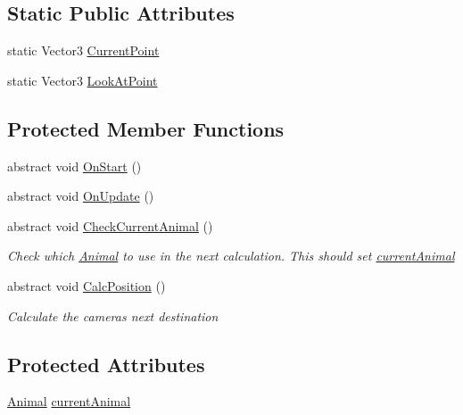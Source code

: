 \subsection*{Static Public Attributes}
\begin{DoxyCompactItemize}
\item 
static Vector3 \mbox{\hyperlink{class_camera_mover_af5e137b14fa9ab77c866f8eb5c961373}{Current\+Point}}
\item 
static Vector3 \mbox{\hyperlink{class_camera_mover_a52c7a78c67f185461d25120f42395db3}{Look\+At\+Point}}
\end{DoxyCompactItemize}
\subsection*{Protected Member Functions}
\begin{DoxyCompactItemize}
\item 
abstract void \mbox{\hyperlink{class_camera_mover_ab96169179c915b4c8599c956dc572fc7}{On\+Start}} ()
\item 
abstract void \mbox{\hyperlink{class_camera_mover_add4a882d9c8684a75d9d2cdacf90a74f}{On\+Update}} ()
\item 
abstract void \mbox{\hyperlink{class_camera_mover_ae1a5b4f8f531adf79cdea73c27ca8203}{Check\+Current\+Animal}} ()
\begin{DoxyCompactList}\small\item\em Check which \mbox{\hyperlink{class_animal}{Animal}} to use in the next calculation. This should set \mbox{\hyperlink{class_camera_mover_a8b863da058e5a1984fd686e09ee2689f}{current\+Animal}} \end{DoxyCompactList}\item 
abstract void \mbox{\hyperlink{class_camera_mover_afe44c2188d44a3fdb72acdf0d12563a9}{Calc\+Position}} ()
\begin{DoxyCompactList}\small\item\em Calculate the camera\textquotesingle{}s next destination \end{DoxyCompactList}\end{DoxyCompactItemize}
\subsection*{Protected Attributes}
\begin{DoxyCompactItemize}
\item 
\mbox{\hyperlink{class_animal}{Animal}} \mbox{\hyperlink{class_camera_mover_a8b863da058e5a1984fd686e09ee2689f}{current\+Animal}}
\end{DoxyCompactItemize}


